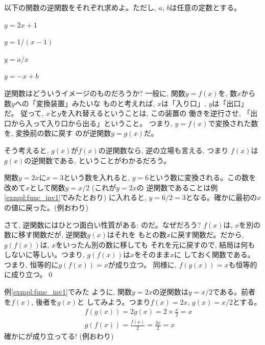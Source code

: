 \begin{q}\label{q:func_inv0} 以下の関数の逆関数をそれぞれ求めよ。ただし, $a$, $b$は任意の定数とする。
\begin{edaenumerate}
\item $y=2x+1$
\item $y=1/(x-1)$
\item $y=a/x$
\item $y=-x+b$
\end{edaenumerate}
\end{q}\mv

逆関数はどういうイメージのものだろうか? 一般に, 
関数$y=f(x)$を, 数$x$から数$y$への「変換装置」みたいな
ものと考えれば, $x$は「入り口」, $y$は「出口」だ。
従って, $x$と$y$を入れ替えるということは, この装置の
働きを逆行させ, 「出口から入って入り口から出る」ということ。
つまり, $y=f(x)$で変換された数を, 変換前の数に戻す
のが逆関数$y=g(x)$だ。

そう考えると, $g(x)$が$f(x)$の逆関数なら, 逆の立場も言える, つまり
$f(x)$は$g(x)$の逆関数である, ということがわかるだろう。

\begin{exmpl}\label{exmpl:func_inv2} 関数$y=2x$に$x=3$という数を入れると, 
$y=6$という数に変換される。この数を改めて$x$として関数$y=x/2$ (これが$y=2x$の
逆関数であることは例\ref{exmpl:func_inv1}でみたとおり) に入れると, 
$y=6/2=3$となる。確かに最初の$x$の値に戻った。(例おわり)\end{exmpl}\mv

さて, 逆関数にはひとつ面白い性質がある: 
のだ。なぜだろう? 
$f(x)$は, $x$を別の数に移す関数だが, 逆関数$g(x)$はそれを
もとの数$x$に戻す関数だ。だから, $g(f(x))$は, $x$をいったん別の数に移しても
それを元に戻すので, 結局は何もしないに等しい。つまり, $g(f(x))$は$x$をそのまま$x$に
しておく関数である。つまり, 恒等的に$g(f(x))=x$が成り立つ。
同様に, $f(g(x))=x$も恒等的に成り立つ。\qed

\begin{exmpl}\label{exmpl:func_inv3} 例\ref{exmpl:func_inv1}でみた
ように, 関数$y=2x$の逆関数は$y=x/2$である。前者を$f(x)$, 後者を$g(x)$と
してみよう。つまり$f(x)=2x$, $g(x)=x/2$とする。
\begin{eqnarray}
&&f(g(x))=2g(x)=2\times\frac{x}{2}=x\\
&&g(f(x))=\frac{f(x)}{2}=\frac{2x}{2}=x
\end{eqnarray}
確かにが成り立ってる! (例おわり)\end{exmpl}

